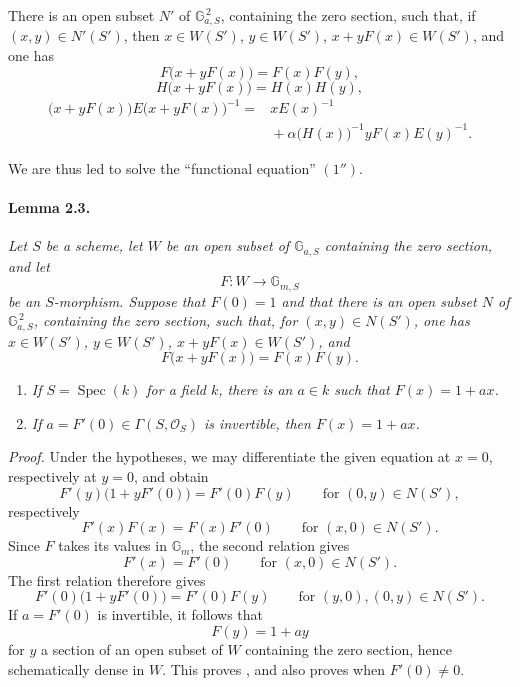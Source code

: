 There is an open subset \(N'\) of
\(\mathbb G_{a,S}^{\,2}\), containing the zero section, such that,
if \((x,y)\in N'(S')\), then \(x\in W(S')\), \(y\in W(S')\),
\(x+yF(x)\in W(S')\), and one has
\begin{equation}\tag{4''}
  F\bigl(x+yF(x)\bigr)=F(x)F(y),
\end{equation}
\begin{equation}\tag{5''}
  H\bigl(x+yF(x)\bigr)=H(x)H(y),
\end{equation}
\begin{equation}\tag{6''}
\begin{split}
  \bigl(x+yF(x)\bigr)E\bigl(x+yF(x)\bigr)^{-1}
   ={}&xE(x)^{-1}\\
     &{}+\alpha\bigl(H(x)\bigr)^{-1}yF(x)E(y)^{-1}.
\end{split}
\end{equation}

We are thus led to solve the ``functional equation'' \((1'')\).

\paragraph{\textbf{Lemma 2.3.}}
\emph{Let \(S\) be a scheme, let \(W\) be an open subset of
\(\mathbb G_{a,S}\) containing the zero section, and let}
\[
  F\colon W\longrightarrow\mathbb G_{m,S}
\]
\emph{be an \(S\)-morphism. Suppose that \(F(0)=1\) and that there
is an open subset \(N\) of \(\mathbb G_{a,S}^{\,2}\), containing
the zero section, such that, for \((x,y)\in N(S')\), one has
\(x\in W(S')\), \(y\in W(S')\), \(x+yF(x)\in W(S')\), and}
\[
  F\bigl(x+yF(x)\bigr)=F(x)F(y).
\]
\begin{enumerate}
\item[\textup{\SGAInlineRefTarget{sga3:xx:2.3:item:i}(i)}] \emph{If \(S=\operatorname{Spec}(k)\) for a
  field \(k\), there is an \(a\in k\) such that
  \(F(x)=1+ax\).}
\item[\textup{\SGAInlineRefTarget{sga3:xx:2.3:item:ii}(ii)}] \emph{If
  \(a=F'(0)\in\Gamma(S,\mathscr O_S)\) is invertible, then
  \(F(x)=1+ax\).}
\end{enumerate}

\medskip
\noindent\emph{Proof.}
Under the hypotheses, we may differentiate the given equation at
\(x=0\), respectively at \(y=0\), and obtain
\[
  F'(y)\bigl(1+yF'(0)\bigr)=F'(0)F(y)
  \qquad\text{for }(0,y)\in N(S'),
\]
respectively
\[
  F'(x)F(x)=F(x)F'(0)
  \qquad\text{for }(x,0)\in N(S').
\]
Since \(F\) takes its values in \(\mathbb G_m\), the second
relation gives
\[
  F'(x)=F'(0)\qquad\text{for }(x,0)\in N(S').
\]
The first relation therefore gives
\[
  F'(0)\bigl(1+yF'(0)\bigr)=F'(0)F(y)
  \qquad\text{for }(y,0),(0,y)\in N(S').
\]
If \(a=F'(0)\) is invertible, it follows that
\[
  F(y)=1+ay
\]
for \(y\) a section of an open subset of \(W\) containing the zero
section, hence schematically dense in \(W\). This proves
\textup{}, and also proves \textup{} when \(F'(0)\ne0\).

